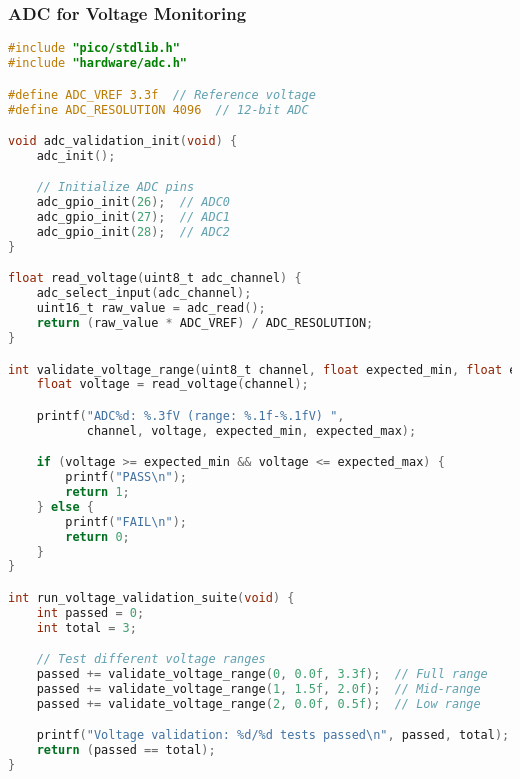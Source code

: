 \documentclass{beamer}
\begin{document}
\begin{frame}[fragile]
\frametitle{ADC for Voltage Monitoring}
\begin{lstlisting}[language=C]
#include "pico/stdlib.h"
#include "hardware/adc.h"

#define ADC_VREF 3.3f  // Reference voltage
#define ADC_RESOLUTION 4096  // 12-bit ADC

void adc_validation_init(void) {
    adc_init();

    // Initialize ADC pins
    adc_gpio_init(26);  // ADC0
    adc_gpio_init(27);  // ADC1
    adc_gpio_init(28);  // ADC2
}

float read_voltage(uint8_t adc_channel) {
    adc_select_input(adc_channel);
    uint16_t raw_value = adc_read();
    return (raw_value * ADC_VREF) / ADC_RESOLUTION;
}

int validate_voltage_range(uint8_t channel, float expected_min, float expected_max) {
    float voltage = read_voltage(channel);

    printf("ADC%d: %.3fV (range: %.1f-%.1fV) ",
           channel, voltage, expected_min, expected_max);

    if (voltage >= expected_min && voltage <= expected_max) {
        printf("PASS\n");
        return 1;
    } else {
        printf("FAIL\n");
        return 0;
    }
}

int run_voltage_validation_suite(void) {
    int passed = 0;
    int total = 3;

    // Test different voltage ranges
    passed += validate_voltage_range(0, 0.0f, 3.3f);  // Full range
    passed += validate_voltage_range(1, 1.5f, 2.0f);  // Mid-range
    passed += validate_voltage_range(2, 0.0f, 0.5f);  // Low range

    printf("Voltage validation: %d/%d tests passed\n", passed, total);
    return (passed == total);
}
\end{lstlisting}
\end{frame}
\end{document}
